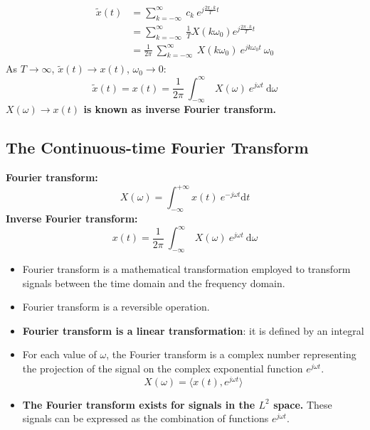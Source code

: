\begin{ex}{}
    \begin{align*}
    \begin{split}
        \tilde{x}(t) &=\sum_{k=-\infty}^{\infty} \ c_{k} \ e^{j\frac{2\pi\cdot k}{T}t}\\
        &= \sum_{k=-\infty}^{\infty}  \ \frac{1}{T} X(k\omega_{0}) e^{j\frac{2\pi\cdot k}{T}t}\\
        &= \frac{1}{2 \pi} \ \sum_{k=-\infty}^{\infty} \ X(k \omega_{0}) \ e^{j k \omega_{0} t} \ \omega_{0} 
    \end{split}
    \end{align*}
    As $T \to \infty$, $\tilde{x}(t) \to x(t)$, $\omega_{0} \to 0$:
    \begin{equation}
        \tilde{x}(t) = x(t) = \frac{1}{2 \pi} \ \int_{-\infty}^{\infty} \ X( \omega) \ e^{j \omega t} \ \mathrm{d}\omega 
    \end{equation}
    \textbf{$X(\omega) \to x(t)$ is known as inverse Fourier transform.}
\end{ex}

\subsection{The Continuous-time Fourier Transform}
\textbf{Fourier transform:}
\[ X(\omega) =  \int_{-\infty}^{+\infty} x(t) \ e^{-j \omega t} \mathrm{d}t \]
\textbf{Inverse Fourier transform:}
\[ x(t) = \frac{1}{2 \pi} \ \int_{-\infty}^{\infty} \ X( \omega) \ e^{j \omega t} \ \mathrm{d}\omega \]

\begin{itemize}
    \item Fourier transform is a mathematical transformation employed to transform signals between the time domain and the frequency domain.
    
    \item Fourier transform is a reversible operation.
    
    \item \textbf{Fourier transform is a linear transformation}: it is defined by an integral
    
    \item For each value of $\omega$, the Fourier transform is a complex number representing the projection of the signal on the complex exponential function $e^{j \omega t }$.
    \[ X(\omega) = \langle x(t), e^{j \omega t} \rangle \]
    
    \item \textbf{The Fourier transform exists for signals in the $L^{2}$ space.} These signals can be expressed as the combination of functions $e^{j \omega t}$.
\end{itemize}

